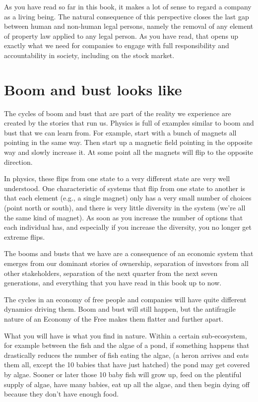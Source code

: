 As you have read so far in this book, it makes a lot of sense to regard a company as a living being. The natural consequence of this perspective closes the last gap between human and non-human legal persons, namely the removal of any element of property law applied to any legal person. As you have read, that opens up exactly what we need for companies to engage with full responsibility and accountability in society, including on the stock market. 


\section{Boom and bust looks like}
The cycles of boom and bust that are part of the reality we experience are created by the stories that run us. Physics is full of examples similar to boom and bust that we can learn from. For example, start with a bunch of magnets all pointing in the same way. Then start up a magnetic field pointing in the opposite way and slowly increase it. At some point all the magnets will flip to the opposite direction.


In physics, these flips from one state to a very different state are very well understood. One characteristic of systems that flip from one state to another is that each element (e.g., a single magnet) only has a very small number of choices (point north or south), and there is very little diversity in the system (we're all the same kind of magnet). As soon as you increase the number of options that each individual has, and especially if you increase the diversity, you no longer get extreme flips.


The booms and busts that we have are a consequence of an economic system that emerges from our dominant stories of ownership, separation of investors from all other stakeholders, separation of the next quarter from the next seven generations, and everything that you have read in this book up to now.


The cycles in an economy of free people and companies will have quite different dynamics driving them. Boom and bust will still happen, but the antifragile nature of an Economy of the Free makes them flatter and further apart. 


What you will have is what you find in nature. Within a certain sub-ecosystem, for example between the fish and the algae of a pond, if something happens that drastically reduces the number of fish eating the algae, (a heron arrives and eats them all, except the 10 babies that have just hatched) the pond may get covered by algae. Sooner or later those 10 baby fish will grow up, feed on the plentiful supply of algae, have many babies, eat up all the algae, and then begin dying off because they don't have enough food. 


